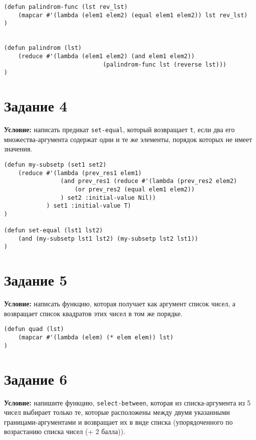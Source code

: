 \begin{lstlisting}
(defun palindrom-func (lst rev_lst)
    (mapcar #'(lambda (elem1 elem2) (equal elem1 elem2)) lst rev_lst)
)


(defun palindrom (lst)
    (reduce #'(lambda (elem1 elem2) (and elem1 elem2)) 
                            (palindrom-func lst (reverse lst)))
)
\end{lstlisting}


\section{Задание 4}

\textbf{Условие:} написать предикат \texttt{set-equal}, который возвращает \texttt{t}, если два его множества-аргумента содержат одни и те же элементы, порядок которых не имеет значения.

\begin{lstlisting}
(defun my-subsetp (set1 set2)
    (reduce #'(lambda (prev_res1 elem1)
                (and prev_res1 (reduce #'(lambda (prev_res2 elem2)
                    (or prev_res2 (equal elem1 elem2))
                ) set2 :initial-value Nil))
            ) set1 :initial-value T)
)

(defun set-equal (lst1 lst2)
    (and (my-subsetp lst1 lst2) (my-subsetp lst2 lst1))
)
\end{lstlisting}


\section{Задание 5}

\textbf{Условие:} написать функцию, которая получает как аргумент список чисел, а возвращает список квадратов этих чисел в том же порядке.

\begin{lstlisting}
(defun quad (lst)
    (mapcar #'(lambda (elem) (* elem elem)) lst)
)
\end{lstlisting}


\section{Задание 6}

\textbf{Условие:} напишите функцию, \texttt{select-between}, которая из списка-аргумента из 5 чисел выбирает только те, которые расположены между двумя указанными границами-аргументами и возвращает их в виде списка (упорядоченного по возрастанию списка чисел (+ 2 балла)).

